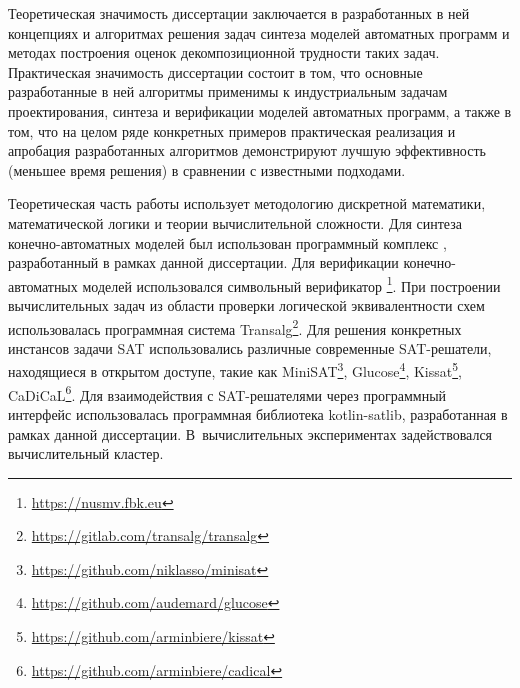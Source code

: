 \influence
%
Теоретическая значимость диссертации заключается в разработанных в ней концепциях и алгоритмах решения задач синтеза моделей автоматных программ и методах построения оценок декомпозиционной трудности таких задач.
Практическая значимость диссертации состоит в том, что основные разработанные в ней алгоритмы применимы к индустриальным задачам проектирования, синтеза и верификации моделей автоматных программ, а также в том, что на целом ряде конкретных примеров практическая реализация и апробация разработанных алгоритмов демонстрируют лучшую эффективность (меньшее время решения) в сравнении с известными подходами.


\methods
%
Теоретическая часть работы использует методологию дискретной математики, математической логики и теории вычислительной сложности.
Для синтеза конечно-автоматных моделей был использован программный комплекс , разработанный в рамках данной диссертации.
Для верификации конечно-автоматных моделей использовался символьный верификатор \footnote{\url{https://nusmv.fbk.eu}}.
При построении вычислительных задач из области проверки логической эквивалентности схем использовалась программная система Transalg\footnote{\url{https://gitlab.com/transalg/transalg}}.
Для решения конкретных инстансов задачи SAT использовались различные современные SAT-решатели, находящиеся в открытом доступе, такие как MiniSAT\footnote{\url{https://github.com/niklasso/minisat}}, Glucose\footnote{\url{https://github.com/audemard/glucose}}, Kissat\footnote{\url{https://github.com/arminbiere/kissat}}, CaDiCaL\footnote{\url{https://github.com/arminbiere/cadical}}.
Для взаимодействия с SAT-решателями через программный интерфейс использовалась программная библиотека kotlin-satlib, разработанная в рамках данной диссертации.
В~вычислительных экспериментах задействовался вычислительный кластер.


